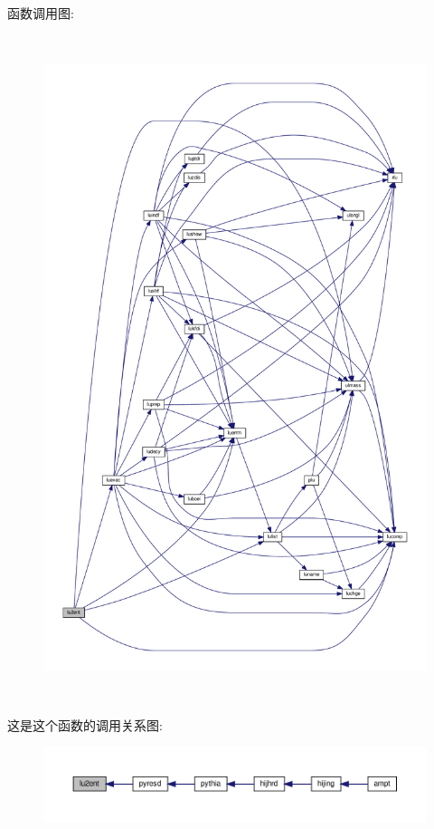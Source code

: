 函数调用图\+:
\nopagebreak
\begin{figure}[H]
\begin{center}
\leavevmode
\includegraphics[height=550pt]{lu2ent_8f90_a937d3f117ddc7ae42d62b8a892cbd67a_cgraph}
\end{center}
\end{figure}
这是这个函数的调用关系图\+:
\nopagebreak
\begin{figure}[H]
\begin{center}
\leavevmode
\includegraphics[width=350pt]{lu2ent_8f90_a937d3f117ddc7ae42d62b8a892cbd67a_icgraph}
\end{center}
\end{figure}
